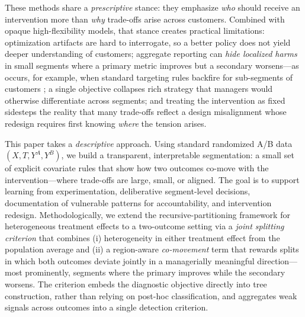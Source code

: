 \documentclass[12pt,a4paper]{article}
\begin{document}
These methods share a \emph{prescriptive} stance: they emphasize \emph{who} should receive an intervention more than \emph{why} trade-offs arise across customers. Combined with opaque high-flexibility models, that stance creates practical limitations: optimization artifacts are hard to interrogate, so a better policy does not yield deeper understanding of customers; aggregate reporting can \emph{hide localized harms} in small segments where a primary metric improves but a secondary worsens---as occurs, for example, when standard targeting rules backfire for sub-segments of customers \citep{ascarza2018retention}; a single objective collapses rich strategy that managers would otherwise differentiate across segments; and treating the intervention as fixed sidesteps the reality that many trade-offs reflect a design misalignment whose redesign requires first knowing \emph{where} the tension arises.

This paper takes a \emph{descriptive} approach. Using standard randomized A/B data $(X, T, Y^A, Y^B)$, we build a transparent, interpretable segmentation: a small set of explicit covariate rules that show how two outcomes co-move with the intervention---where trade-offs are large, small, or aligned. The goal is to support learning from experimentation, deliberative segment-level decisions, documentation of vulnerable patterns for accountability, and intervention redesign. Methodologically, we extend the recursive-partitioning framework for heterogeneous treatment effects \citep{athey2016recursive, wager2018estimation, athey2019grf} to a two-outcome setting via a \emph{joint splitting criterion} that combines (i) heterogeneity in either treatment effect from the population average and (ii) a region-aware \emph{co-movement} term that rewards splits in which both outcomes deviate jointly in a managerially meaningful direction---most prominently, segments where the primary improves while the secondary worsens. The criterion embeds the diagnostic objective directly into tree construction, rather than relying on post-hoc classification, and aggregates weak signals across outcomes into a single detection criterion.
\end{document}
